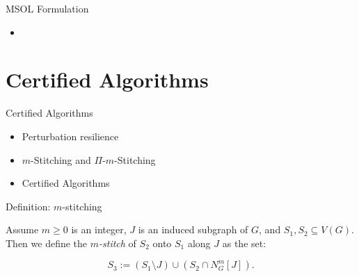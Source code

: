 \documentclass{beamer}
\begin{document}
\begin{frame}{MSOL Formulation}
  \begin{itemize}
    \item 
  \end{itemize}
\end{frame}

\section{Certified Algorithms}

\begin{frame}{Certified Algorithms}
  \begin{itemize}
    \item Perturbation resilience
    \item $m$-Stitching and $\Pi$-$m$-Stitching
    \item Certified Algorithms
  \end{itemize}
\end{frame}


\begin{frame}{Definition: $m$-stitching}
    \begin{definition}[$m$-stitching]
        \label{m-stitch}
        Assume $m \geq 0$ is an integer, $J$ is an induced subgraph of $G$, and 
        $S_1, S_2 \subseteq V(G)$. Then we define the \textit{$m$-stitch} of $S_2$ onto $S_1$ along 
        $J$ as the set:

        \[
        S_3 := (S_1 \setminus J) \cup (S_2 \cap N^{m}_{G}[J]).
        \]
    \end{definition}
\end{frame}
\end{document}
